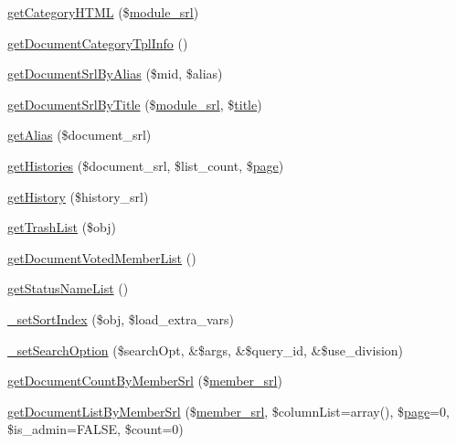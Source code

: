 \begin{DoxyCompactItemize}
\item 
\hyperlink{classdocumentModel_aaef2e7fbbf9029fbee0aaa6e0d97f97f}{get\+Category\+H\+T\+ML} (\$\hyperlink{ko_8install_8php_a370bb6450fab1da3e0ed9f484a38b761}{module\+\_\+srl})
\item 
\hyperlink{classdocumentModel_a237a07a80ec3e7e8825207dec22d3f3d}{get\+Document\+Category\+Tpl\+Info} ()
\item 
\hyperlink{classdocumentModel_a48ea5734f5dc53ab463d5b59a6b98dab}{get\+Document\+Srl\+By\+Alias} (\$mid, \$alias)
\item 
\hyperlink{classdocumentModel_ae743013207d178a0115a3116f8576786}{get\+Document\+Srl\+By\+Title} (\$\hyperlink{ko_8install_8php_a370bb6450fab1da3e0ed9f484a38b761}{module\+\_\+srl}, \$\hyperlink{ko_8install_8php_a5b072c5fd1d2228c6ba5cee13cd142e3}{title})
\item 
\hyperlink{classdocumentModel_a432924d21a54089bb55cae2f3dc9dfd1}{get\+Alias} (\$document\+\_\+srl)
\item 
\hyperlink{classdocumentModel_a7f66805da3386473c2e530f767301ff8}{get\+Histories} (\$document\+\_\+srl, \$list\+\_\+count, \$\hyperlink{classpage}{page})
\item 
\hyperlink{classdocumentModel_ac21b570d350dc1e0f6f990750b673f72}{get\+History} (\$history\+\_\+srl)
\item 
\hyperlink{classdocumentModel_a428c7beb4eb06031f1412a58c017ea20}{get\+Trash\+List} (\$obj)
\item 
\hyperlink{classdocumentModel_ab0f8e68c8df234d70ce66bd286df3015}{get\+Document\+Voted\+Member\+List} ()
\item 
\hyperlink{classdocumentModel_a47541348b4212971ce508fb2a24ce4f3}{get\+Status\+Name\+List} ()
\item 
\hyperlink{classdocumentModel_a5e4a2c7a303637e89ace7882a9a0d77c}{\+\_\+set\+Sort\+Index} (\$obj, \$load\+\_\+extra\+\_\+vars)
\item 
\hyperlink{classdocumentModel_aba67b239466934c3eff8b4b4f5adc8a5}{\+\_\+set\+Search\+Option} (\$search\+Opt, \&\$args, \&\$query\+\_\+id, \&\$use\+\_\+division)
\item 
\hyperlink{classdocumentModel_aef8741dec5f19c45c98d9d749974c82b}{get\+Document\+Count\+By\+Member\+Srl} (\$\hyperlink{ko_8install_8php_aa61f9e08f0fe505094d26f8143f30bbd}{member\+\_\+srl})
\item 
\hyperlink{classdocumentModel_a27d9af35978748d347769b3bb0ca03c0}{get\+Document\+List\+By\+Member\+Srl} (\$\hyperlink{ko_8install_8php_aa61f9e08f0fe505094d26f8143f30bbd}{member\+\_\+srl}, \$column\+List=array(), \$\hyperlink{classpage}{page}=0, \$is\+\_\+admin=F\+A\+L\+SE, \$count=0)
\end{DoxyCompactItemize}
